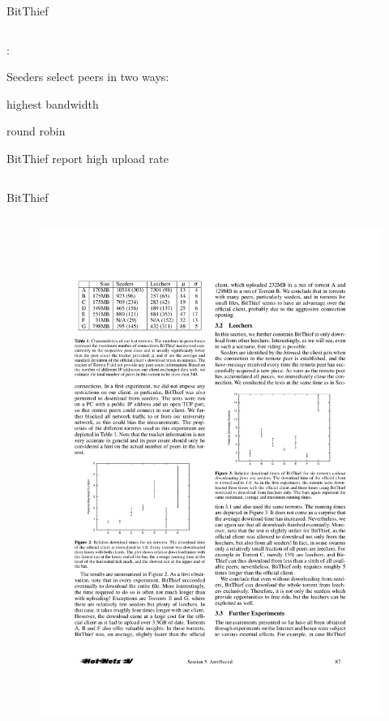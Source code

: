 \begin{frame}{BitThief}
\begin{columns}
\begin{column}{0.56\textwidth}
:
\BI
\item Seeders select peers in two ways:
	\BI
	\item highest bandwidth
	\item round robin
	\EI
\item BitThief report high upload rate
\EI

\end{column}
\end{columns}

\end{frame}

\begin{frame}{BitThief}

\begin{columns}
\begin{column}{0.40\textwidth}
\begin{figure}
	\includegraphics[width=\textwidth]{figs/10/bitthief2}

\end{figure}
\end{column}
\end{columns}
\end{frame}
